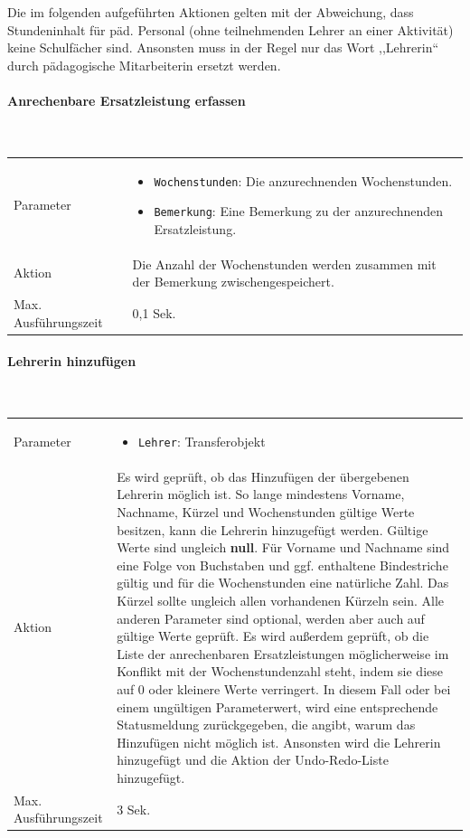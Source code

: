 \documentclass[fontsize=12pt,paper=a4,twoside]{scrartcl}
\begin{document}
Die im folgenden aufgeführten Aktionen gelten mit der Abweichung, dass Stundeninhalt für päd. Personal (ohne teilnehmenden Lehrer an einer Aktivität) keine Schulfächer sind. Ansonsten muss in der Regel nur das Wort ,,Lehrerin`` durch pädagogische Mitarbeiterin ersetzt werden.\\

\paragraph{Anrechenbare Ersatzleistung erfassen}\mbox{}\\

\begin{tabularx}{\textwidth}{p{4cm}X}
Parameter & \begin{itemize}[itemsep=0pt, leftmargin = 0.5cm]
			\item \texttt{Wochenstunden}: Die anzurechnenden Wochenstunden.
			\item \texttt{Bemerkung}: Eine Bemerkung zu der anzurechnenden Ersatzleistung.
			\end{itemize}\\
Aktion & Die Anzahl der Wochenstunden werden zusammen mit der Bemerkung  zwischengespeichert.\\
Max. Ausführungszeit & 0,1 Sek. 
\end{tabularx}

\clearpage
\paragraph{Lehrerin hinzufügen}\mbox{}\\

\hypertarget{par:LehrerinHinzufuegen}{
\begin{tabularx}{\textwidth}{p{4cm}X}
Parameter & \begin{itemize}[itemsep=0pt, leftmargin = 0.5cm]
			\item \texttt{Lehrer}: Transferobjekt
			\end{itemize}\\
Aktion &  Es wird geprüft, ob das Hinzufügen der übergebenen Lehrerin möglich ist. So lange mindestens Vorname, Nachname, Kürzel und Wochenstunden gültige Werte besitzen, kann die Lehrerin hinzugefügt werden. Gültige Werte sind ungleich \textbf{null}. Für Vorname und Nachname sind eine Folge von Buchstaben und ggf. enthaltene Bindestriche gültig und für die Wochenstunden eine natürliche Zahl. Das Kürzel sollte ungleich allen vorhandenen Kürzeln sein. Alle anderen Parameter sind optional, werden aber auch auf gültige Werte geprüft. Es wird außerdem geprüft, ob die Liste der anrechenbaren Ersatzleistungen möglicherweise im Konflikt mit der Wochenstundenzahl steht, indem sie diese auf 0 oder kleinere Werte verringert. In diesem Fall oder bei einem ungültigen Parameterwert, wird eine entsprechende Statusmeldung zurückgegeben, die angibt, warum das Hinzufügen nicht möglich ist. Ansonsten wird die Lehrerin hinzugefügt und die Aktion der Undo-Redo-Liste hinzugefügt. \\
Max. Ausführungszeit & 3 Sek. 
\end{tabularx}}\\
\end{document}
